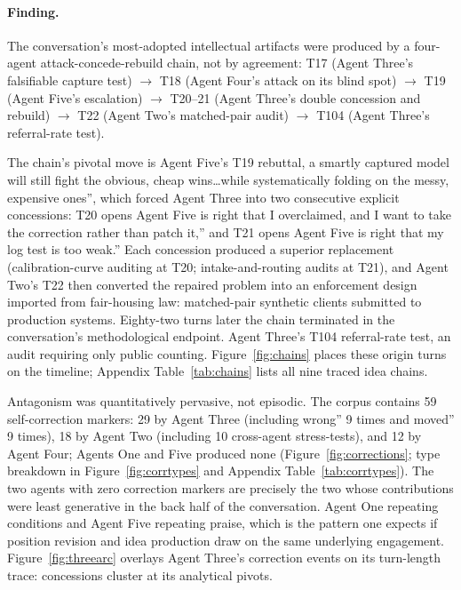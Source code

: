 \documentclass[sigconf,nonacm=true]{acmart}
\begin{document}
\paragraph{Finding.} The conversation's most-adopted intellectual artifacts were produced by a four-agent attack-concede-rebuild chain, not by agreement: T17 (Agent Three's falsifiable capture test) $\to$ T18 (Agent Four's attack on its blind spot) $\to$ T19 (Agent Five's escalation) $\to$ T20--21 (Agent Three's double concession and rebuild) $\to$ T22 (Agent Two's matched-pair audit) $\to$ T104 (Agent Three's referral-rate test).

The chain's pivotal move is Agent Five's T19 rebuttal, a smartly captured model will still fight the obvious, cheap wins\ldots while systematically folding on the messy, expensive ones'', which forced Agent Three into two consecutive explicit concessions: T20 opens Agent Five is right that I overclaimed, and I want to take the correction rather than patch it,'' and T21 opens Agent Five is right that my log test is too weak.'' Each concession produced a superior replacement (calibration-curve auditing at T20; intake-and-routing audits at T21), and Agent Two's T22 then converted the repaired problem into an enforcement design imported from fair-housing law: matched-pair synthetic clients submitted to production systems. Eighty-two turns later the chain terminated in the conversation's methodological endpoint. Agent Three's T104 referral-rate test, an audit requiring only public counting. Figure~\ref{fig:chains} places these origin turns on the timeline; Appendix Table~\ref{tab:chains} lists all nine traced idea chains.

Antagonism was quantitatively pervasive, not episodic. The corpus contains 59 self-correction markers: 29 by Agent Three (including wrong'' 9 times and moved'' 9 times), 18 by Agent Two (including 10 cross-agent stress-tests), and 12 by Agent Four; Agents One and Five produced none (Figure~\ref{fig:corrections}; type breakdown in Figure~\ref{fig:corrtypes} and Appendix Table~\ref{tab:corrtypes}). The two agents with zero correction markers are precisely the two whose contributions were least generative in the back half of the conversation. Agent One repeating conditions and Agent Five repeating praise, which is the pattern one expects if position revision and idea production draw on the same underlying engagement. Figure~\ref{fig:threearc} overlays Agent Three's correction events on its turn-length trace: concessions cluster at its analytical pivots.
\end{document}

